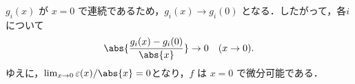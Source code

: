\begin{tproof}
\begin{description}
              $ g_i(x) $ が $ x=0 $ で連続であるため，$ g_i(x) \to g_i(0) $ となる．したがって，各$ i $について
              \[
                  \abs{ \frac{g_i(x) - g_i(0)}{\abs{x}} } \to 0 \quad (x \to 0).
              \]
              ゆえに，$\lim_{x \to 0} \varepsilon(x)/\abs{x} = 0$となり，$ f $ は $ x=0 $ で微分可能である．
    \end{description}
\end{tproof}
